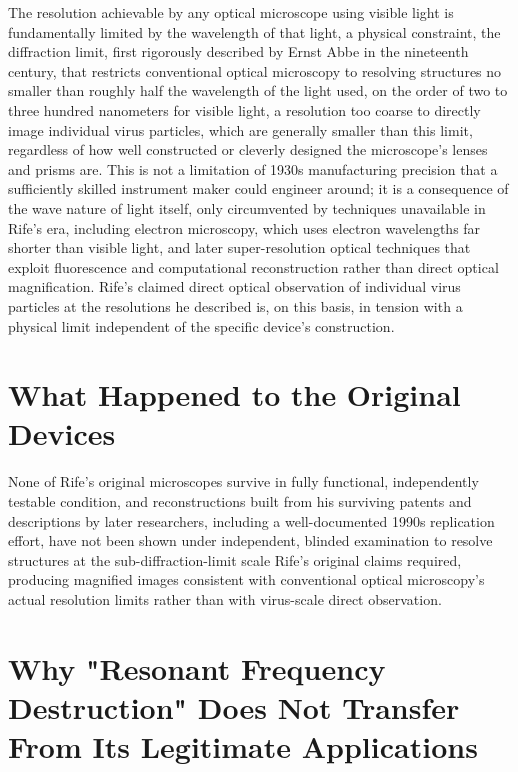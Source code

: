 \documentclass[11pt]{article}
\begin{document}
The resolution achievable by any optical microscope using visible light is fundamentally limited by the wavelength of that light, a physical constraint, the diffraction limit, first rigorously described by Ernst Abbe in the nineteenth century, that restricts conventional optical microscopy to resolving structures no smaller than roughly half the wavelength of the light used, on the order of two to three hundred nanometers for visible light, a resolution too coarse to directly image individual virus particles, which are generally smaller than this limit, regardless of how well constructed or cleverly designed the microscope's lenses and prisms are. This is not a limitation of 1930s manufacturing precision that a sufficiently skilled instrument maker could engineer around; it is a consequence of the wave nature of light itself, only circumvented by techniques unavailable in Rife's era, including electron microscopy, which uses electron wavelengths far shorter than visible light, and later super-resolution optical techniques that exploit fluorescence and computational reconstruction rather than direct optical magnification. Rife's claimed direct optical observation of individual virus particles at the resolutions he described is, on this basis, in tension with a physical limit independent of the specific device's construction.

\section{What Happened to the Original Devices}

None of Rife's original microscopes survive in fully functional, independently testable condition, and reconstructions built from his surviving patents and descriptions by later researchers, including a well-documented 1990s replication effort, have not been shown under independent, blinded examination to resolve structures at the sub-diffraction-limit scale Rife's original claims required, producing magnified images consistent with conventional optical microscopy's actual resolution limits rather than with virus-scale direct observation.

\section{Why "Resonant Frequency Destruction" Does Not Transfer From Its Legitimate Applications}
\end{document}

